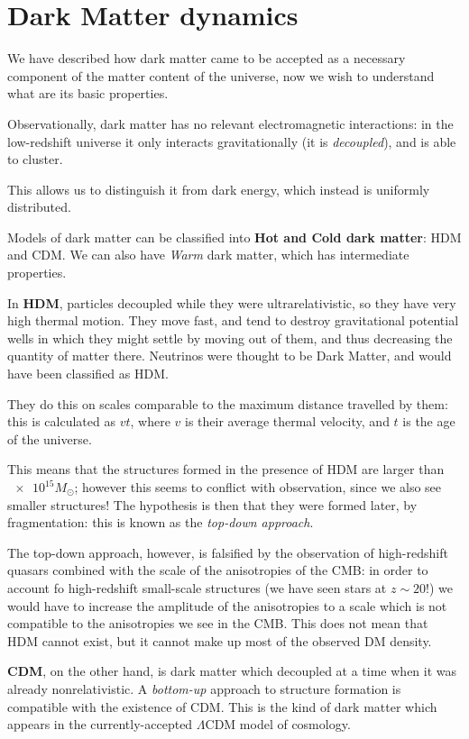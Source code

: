 \documentclass[main.tex]{subfiles}
\begin{document}
\section{Dark Matter dynamics}

We have described how dark matter came to be accepted as a necessary component of the matter content of the universe, now we wish to understand what are its basic properties. 

Observationally, dark matter has no relevant electromagnetic interactions: in the low-redshift universe it only interacts gravitationally (it is \emph{decoupled}), and is able to cluster.

This allows us to distinguish it from dark energy, which instead is uniformly distributed. 

Models of dark matter can be classified into \textbf{Hot and Cold dark matter}: HDM and CDM. 
We can also have \emph{Warm} dark matter, which has intermediate properties.

In \textbf{HDM}, particles decoupled while they were ultrarelativistic, so they have very high thermal motion.
They move fast, and tend to destroy gravitational potential wells in which they might settle by moving out of them, and thus decreasing the quantity of matter there. 
Neutrinos were thought to be Dark Matter, and would have been classified as HDM. 

They do this on scales comparable to the maximum distance travelled by them: this is calculated as \(vt\), where \(v\) is their average thermal velocity, and \(t\) is the age of the universe. 

This means that the structures formed in the presence of HDM are larger than \(\num{e15} M_{\odot}\); however this seems to conflict with observation, since we also see smaller structures!
The hypothesis is then that they were formed later, by fragmentation: this is known as the \emph{top-down approach}. 

The top-down approach, however, is falsified by the observation of high-redshift quasars combined with the scale of the anisotropies of the CMB: in order to account fo high-redshift small-scale structures (we have seen stars at \(z \sim 20\)!) we would have to increase the amplitude of the anisotropies to a scale which is not compatible to the anisotropies we see in the CMB. 
This does not mean that HDM cannot exist, but it cannot make up most of the observed DM density. 

\textbf{CDM}, on the other hand, is dark matter which decoupled at a time when it was already nonrelativistic. 
A \emph{bottom-up} approach to structure formation is compatible with the existence of CDM.
This is the kind of dark matter which appears in the currently-accepted \(\Lambda\)CDM model of cosmology.
\end{document}

